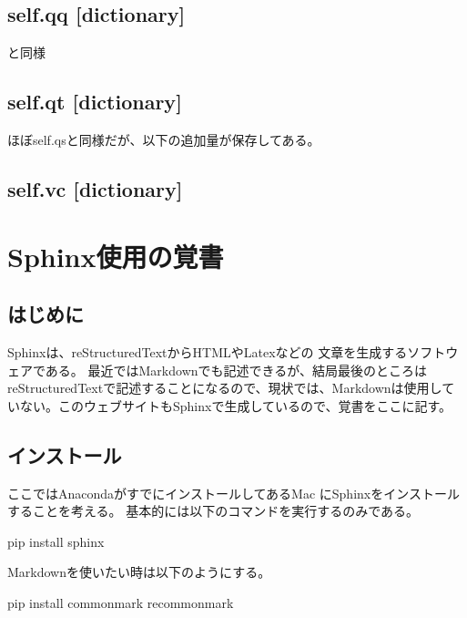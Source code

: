 \documentclass[letterpaper,10pt,dvipdfmx,report]{sphinxmanual}
\begin{document}
\section{self.qq {[}dictionary{]}}
\label{\detokenize{notation:self-qq-dictionary}}
 と同様


\section{self.qt {[}dictionary{]}}
\label{\detokenize{notation:self-qt-dictionary}}
ほぼself.qsと同様だが、以下の追加量が保存してある。


\section{self.vc {[}dictionary{]}}
\label{\detokenize{notation:self-vc-dictionary}}

\chapter{Sphinx使用の覚書}
\label{\detokenize{sphinx:sphinx}}\label{\detokenize{sphinx::doc}}

\section{はじめに}
\label{\detokenize{sphinx:id1}}
Sphinxは、reStructuredTextからHTMLやLatexなどの
文章を生成するソフトウェアである。
最近ではMarkdownでも記述できるが、結局最後のところはreStructuredTextで記述することになるので、現状では、Markdownは使用していない。このウェブサイトもSphinxで生成しているので、覚書をここに記す。


\section{インストール}
\label{\detokenize{sphinx:id3}}
ここではAnacondaがすでにインストールしてあるMac
にSphinxをインストールすることを考える。
基本的には以下のコマンドを実行するのみである。

\begin{sphinxVerbatim}[commandchars=\\\{\}]
pip install sphinx
\end{sphinxVerbatim}

Markdownを使いたい時は以下のようにする。

\begin{sphinxVerbatim}[commandchars=\\\{\}]
pip install commonmark recommonmark
\end{sphinxVerbatim}
\end{document}
